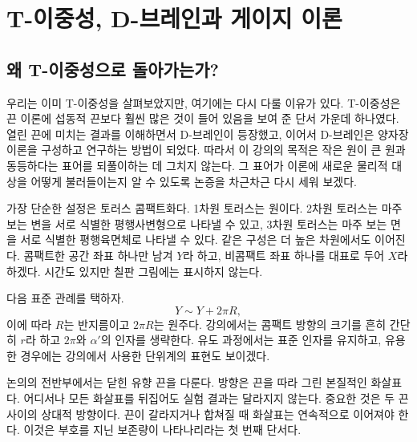 \chapter{T-이중성, D-브레인과 게이지 이론}


\section{왜 T-이중성으로 돌아가는가?}

우리는 이미 T-이중성을 살펴보았지만, 여기에는 다시 다룰 이유가 있다. T-이중성은 끈 이론에 섭동적 끈보다 훨씬 많은 것이 들어 있음을 보여 준 단서 가운데 하나였다. 열린 끈에 미치는 결과를 이해하면서 D-브레인이 등장했고, 이어서 D-브레인은 양자장 이론을 구성하고 연구하는 방법이 되었다. 따라서 이 강의의 목적은 작은 원이 큰 원과 동등하다는 표어를 되풀이하는 데 그치지 않는다. 그 표어가 이론에 새로운 물리적 대상을 어떻게 불러들이는지 알 수 있도록 논증을 차근차근 다시 세워 보겠다.

가장 단순한 설정은 토러스 콤팩트화다. 1차원 토러스는 원이다. 2차원 토러스는 마주 보는 변을 서로 식별한 평행사변형으로 나타낼 수 있고, 3차원 토러스는 마주 보는 면을 서로 식별한 평행육면체로 나타낼 수 있다. 같은 구성은 더 높은 차원에서도 이어진다. 콤팩트한 공간 좌표 하나만 남겨 \(Y\)라 하고, 비콤팩트 좌표 하나를 대표로 두어 \(X\)라 하겠다. 시간도 있지만 칠판 그림에는 표시하지 않는다.

다음 표준 관례를 택하자.
\begin{equation}
  Y\sim Y+2\pi R,
  \label{eq:l10-circle-identification}
\end{equation}
이에 따라 \(R\)는 반지름이고 \(2\pi R\)는 원주다. 강의에서는 콤팩트 방향의 크기를 흔히 간단히 \(r\)라 하고 \(2\pi\)와 \(\alpha'\)의 인자를 생략한다. 유도 과정에서는 표준 인자를 유지하고, 유용한 경우에는 강의에서 사용한 단위계의 표현도 보이겠다.

논의의 전반부에서는 닫힌 유향 끈을 다룬다. 방향은 끈을 따라 그린 본질적인 화살표다. 어디서나 모든 화살표를 뒤집어도 실험 결과는 달라지지 않는다. 중요한 것은 두 끈 사이의 상대적 방향이다. 끈이 갈라지거나 합쳐질 때 화살표는 연속적으로 이어져야 한다. 이것은 부호를 지닌 보존량이 나타나리라는 첫 번째 단서다.


